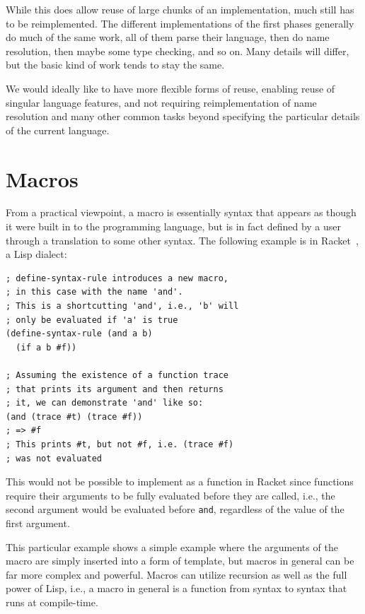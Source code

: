 \documentclass{kththesis}
\begin{document}
While this does allow reuse of large chunks of an implementation, much still has to be reimplemented. The different implementations of the first phases generally do much of the same work, all of them parse their language, then do name resolution, then maybe some type checking, and so on. Many details will differ, but the basic kind of work tends to stay the same.

We would ideally like to have more flexible forms of reuse, enabling reuse of singular language features, and not requiring reimplementation of name resolution and many other common tasks beyond specifying the particular details of the current language.

\section{Macros} \label{sec:introduction-macros}

From a practical viewpoint, a macro is essentially syntax that appears as though it were built in to the programming language, but is in fact defined by a user through a translation to some other syntax. The following example is in Racket~\cite{Flatt2010Reference:-Rack}, a Lisp dialect:

\begin{verbatim}
; define-syntax-rule introduces a new macro,
; in this case with the name 'and'.
; This is a shortcutting 'and', i.e., 'b' will
; only be evaluated if 'a' is true
(define-syntax-rule (and a b)
  (if a b #f))

; Assuming the existence of a function trace
; that prints its argument and then returns
; it, we can demonstrate 'and' like so:
(and (trace #t) (trace #f))
; => #f
; This prints #t, but not #f, i.e. (trace #f)
; was not evaluated
\end{verbatim}

This would not be possible to implement as a function in Racket since functions require their arguments to be fully evaluated before they are called, i.e., the second argument would be evaluated before \texttt{and}, regardless of the value of the first argument.

This particular example shows a simple example where the arguments of the macro are simply inserted into a form of template, but macros in general can be far more complex and powerful. Macros can utilize recursion as well as the full power of Lisp, i.e., a macro in general is a function from syntax to syntax that runs at compile-time.
\end{document}
